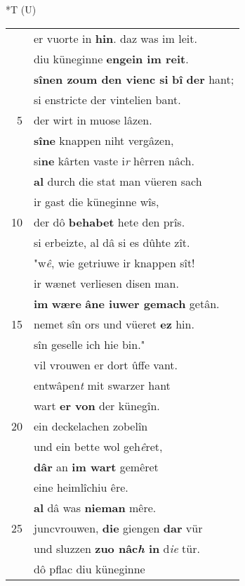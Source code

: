 \documentclass[8pt,a4paper,notitlepage]{article}
\begin{document}
\begin{table}[ht]
\begin{minipage}[t]{0.5\linewidth}
\end{minipage}
\hspace{0.5cm}
\begin{minipage}[t]{0.5\linewidth}
\small
\begin{center}*T (U)
\end{center}
\begin{tabular}{rl}
 & er vuorte in \textbf{hin}. daz was im leit.\\ 
 & diu küneginne \textbf{engein im reit}.\\ 
 & \textbf{sînen zoum den vienc si} \textbf{bî} \textbf{der} hant;\\ 
 & si enstricte der vintelien bant.\\ 
5 & der wirt in muose lâzen.\\ 
 & \textbf{sîne} knappen niht vergâzen,\\ 
 & si\textbf{ne} kârten vaste i\textit{r} hêrren nâch.\\ 
 & \textbf{al} durch die stat man vüeren sach\\ 
 & ir gast die küneginne wîs,\\ 
10 & der dô \textbf{behabet} hete den prîs.\\ 
 & si erbeizte, al dâ si es dûhte zît.\\ 
 & "w\textit{ê}, wie getriuwe ir knappen sît!\\ 
 & ir wænet verliesen disen man.\\ 
 & \textbf{im} \textbf{wære} \textbf{âne iuwer gemach} getân.\\ 
15 & nemet sîn ors und vüeret \textbf{ez} hin.\\ 
 & sîn geselle ich hie bin."\\ 
 & vil vrouwen er dort ûffe vant.\\ 
 & entwâpen\textit{t} mit swarzer hant\\ 
 & wart \textbf{er von} der künegîn.\\ 
20 & ein deckelachen zobelîn\\ 
 & und ein bette wol geh\textit{ê}ret,\\ 
 & \textbf{dâr} an \textbf{im wart} gemêret\\ 
 & eine heimlîchiu êre.\\ 
 & \textbf{al} dâ was \textbf{nieman} mêre.\\ 
25 & juncvrouwen, \textbf{die} giengen \textbf{dar} vür\\ 
 & und sluzzen \textbf{zuo nâc\textit{h} in} d\textit{ie} tür.\\ 
 & dô pflac diu küneginne\\ 

\end{tabular}
\end{minipage}
\end{table}
\end{document}
